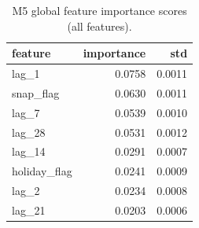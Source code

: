\begin{table}
\caption{M5 global feature importance scores (all features).}
\label{tab:02_m5_global_importance}
\begin{tabular}{lrr}
\toprule
feature & importance & std \\
\midrule
lag_1 & 0.0758 & 0.0011 \\
snap_flag & 0.0630 & 0.0011 \\
lag_7 & 0.0539 & 0.0010 \\
lag_28 & 0.0531 & 0.0012 \\
lag_14 & 0.0291 & 0.0007 \\
holiday_flag & 0.0241 & 0.0009 \\
lag_2 & 0.0234 & 0.0008 \\
lag_21 & 0.0203 & 0.0006 \\
\bottomrule
\end{tabular}
\end{table}
